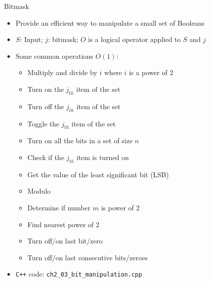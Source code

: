 \documentclass{beamer}
\begin{document}
\begin{frame}[fragile]{Bitmask}
    \begin{itemize}
        \item Provide an efficient way to manipulate a small set of Booleans
        \item $S$: Input; $j$: bitmask; $O$ is a logical operator applied to $S$ and $j$
        \item Some common operations $O(1)$:
            \begin{itemize}
                \item Multiply and divide by $i$ where $i$ is a power of $2$
                \item Turn on the $j_{th}$ item of the set
                \item Turn off the $j_{th}$ item of the set
                \item Toggle the $j_{th}$ item of the set
                \item Turn on all the bits in a set of size $n$
                \item Check if the $j_{th}$ item is turned on
                \item Get the value of the least significant bit (LSB)
                \item Modulo
                \item Determine if number $m$ is power of $2$
                \item Find nearest power of $2$
                \item Turn off/\color{blue}on \color{black} last bit/\color{blue}zero\color{black}
                \item Turn off/\color{blue}on \color{black} last consecutive bits/\color{blue}zeroes\color{black}
            \end{itemize}
        \item \color{red}\verb|C++| code: \verb|ch2_03_bit_manipulation.cpp|\color{black}            
    \end{itemize}
\end{frame}
\end{document}
